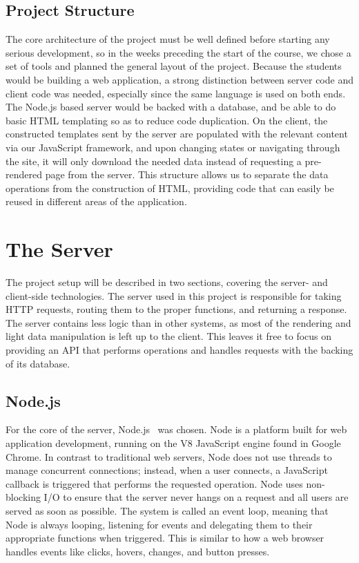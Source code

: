 \documentclass[12pt]{article}
\begin{document}
\subsection{Project Structure}\label{sec:structure}
The core architecture of the project must be well defined before starting any serious development, so in the weeks preceding the start of the course, we chose a set of tools and planned the general layout of the project. 
Because the students would be building a web application, a strong distinction between server code and client code was needed, especially since the same language is used on both ends. 
The Node.js based server would be backed with a database, and be able to do basic HTML templating so as to reduce code duplication. 
On the client, the constructed templates sent by the server are populated with the relevant content via our JavaScript framework, and upon changing states or navigating through the site, it will only download the needed data instead of requesting a pre-rendered page from the server. 
This structure allows us to separate the data operations from the construction of HTML, providing code that can easily be reused in different areas of the application.

\section{The Server}\label{sec:server}
The project setup will be described in two sections, covering the server- and client-side technologies. 
The server used in this project is responsible for taking HTTP requests, routing them to the proper functions, and returning a response. 
The server contains less logic than in other systems, as most of the rendering and light data manipulation is left up to the client. 
This leaves it free to focus on providing an API that performs operations and handles requests with the backing of its database.

\subsection{Node.js}\label{sec:node}
For the core of the server, Node.js~\cite{Node} was chosen. 
Node is a platform built for web application development, running on the V8 JavaScript engine found in Google Chrome. 
In contrast to traditional web servers, Node does not use threads to manage concurrent connections; instead, when a user connects, a JavaScript callback is triggered that performs the requested operation. 
Node uses non-blocking I/O to ensure that the server never hangs on a request and all users are served as soon as possible. 
The system is called an event loop, meaning that Node is always looping, listening for events and delegating them to their appropriate functions when triggered. 
This is similar to how a web browser handles events like clicks, hovers, changes, and button presses. 
\end{document}

